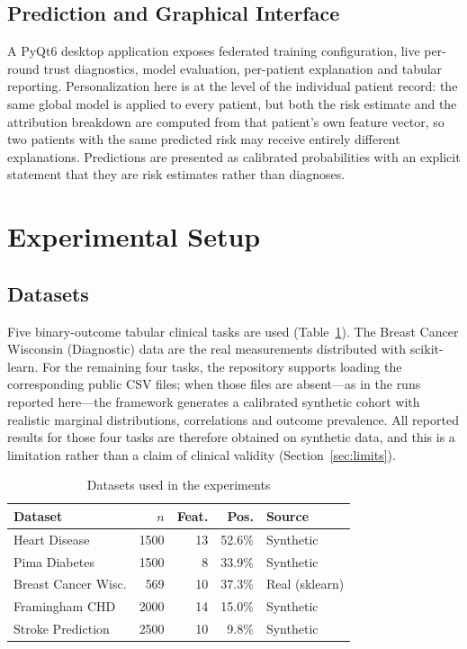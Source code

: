 \documentclass[conference]{IEEEtran}
\begin{document}
\subsection{Prediction and Graphical Interface}
A PyQt6 desktop application exposes federated training configuration, live
per-round trust diagnostics, model evaluation, per-patient explanation and
tabular reporting. Personalization here is at the level of the individual
patient record: the same global model is applied to every patient, but both
the risk estimate and the attribution breakdown are computed from that
patient's own feature vector, so two patients with the same predicted risk
may receive entirely different explanations. Predictions are presented as calibrated probabilities with
an explicit statement that they are risk estimates rather than diagnoses.

\section{Experimental Setup}

\subsection{Datasets}
Five binary-outcome tabular clinical tasks are used
(Table~\ref{tab:datasets}). The Breast Cancer Wisconsin (Diagnostic) data are
the real measurements distributed with scikit-learn. For the remaining four tasks, the repository supports
loading the corresponding public CSV files; when those files are
absent---as in the runs reported here---the framework generates a
calibrated synthetic cohort with realistic marginal distributions,
correlations and outcome prevalence. All reported results for those four
tasks are therefore obtained on synthetic data, and this is a limitation
rather than a claim of clinical validity (Section~\ref{sec:limits}).

\begin{table}[t]
 \caption{Datasets used in the experiments}
 \label{tab:datasets}
 \centering
 \small
 \setlength{\tabcolsep}{3.5pt}
 \begin{tabular}{lrrrl}
 \toprule
 Dataset & $n$ & Feat. & Pos. & Source \\
 \midrule
 Heart Disease & 1500 & 13 & 52.6\% & Synthetic \\
 Pima Diabetes & 1500 & 8 & 33.9\% & Synthetic \\
 Breast Cancer Wisc. & 569 & 10 & 37.3\% & Real (sklearn) \\
 Framingham CHD & 2000 & 14 & 15.0\% & Synthetic \\
 Stroke Prediction & 2500 & 10 & 9.8\% & Synthetic \\
 \bottomrule
 \end{tabular}
\end{table}
\end{document}
